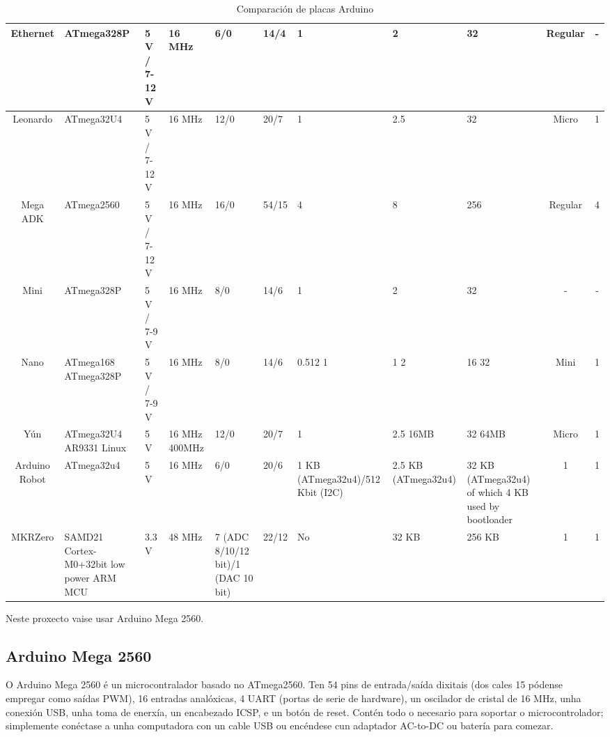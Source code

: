 \documentclass[11pt,twoside]{book}
\begin{document}
\begin{table}[htb]
\begin{center}
{\begin{tabular}{|c|m{3cm}|m{3.5cm}|m{2cm}|m{2cm}|m{2cm}|m{2cm}|m{2cm}|m{2cm}|c|c|}
\hline
Ethernet & ATmega328P & 5 V / 7-12 V & 16 MHz & 6/0 & 14/4 & 1 & 2 & 32 & Regular & - \\
\hline
Leonardo & ATmega32U4 & 5 V / 7-12 V & 16 MHz & 12/0 & 20/7 & 1 & 2.5 & 32 & Micro & 1 \\
\hline
Mega ADK & ATmega2560 & 5 V / 7-12 V & 16 MHz & 16/0 & 54/15 & 4 & 8 & 256 & Regular & 4 \\
\hline
Mini & ATmega328P & 5 V / 7-9 V & 16 MHz & 8/0 & 14/6 & 1 & 2 & 32 & - & - \\
\hline
Nano & ATmega168 \newline ATmega328P & 5 V / 7-9 V & 16 MHz & 8/0 & 14/6 & 0.512  1 & 1  2 & 16 32 & Mini & 1 \\
\hline
Yún & ATmega32U4 \newline AR9331 Linux & 5 V & 16 MHz \newline 400MHz & 12/0 & 20/7 & 1 & 2.5 \newline  16MB & 32 \newline   64MB & Micro & 1 \\
\hline
Arduino Robot & ATmega32u4 & 5 V & 16 MHz & 6/0 & 20/6 & 1 KB (ATmega32u4)/512 Kbit (I2C) & 2.5 KB (ATmega32u4) & 32 KB (ATmega32u4) of which 4 KB used by bootloader & 1 & 1 \\
\hline
MKRZero & SAMD21 \newline  Cortex-M0+32bit low power \newline ARM MCU & 3.3 V & 48 MHz & 7 (ADC 8/10/12 bit)/1 (DAC 10 bit) & 22/12 & No & 32 KB & 256 KB & 1 & 1 \\
\hline
\end{tabular}
}
\caption{Comparación de placas Arduino}
\label{taboa:comparacion}
\end{center}
\end{table}

Neste proxecto vaise usar Arduino Mega 2560.

\subsection{Arduino Mega 2560}

O Arduino Mega 2560 é un microcontralador basado no ATmega2560. Ten 54 pins de entrada/saída dixitais (dos cales 15 pódense empregar como saídas PWM), 16 entradas analóxicas, 4 UART (portas de serie de hardware), un oscilador de cristal de 16 MHz, unha conexión USB, unha toma de enerxía, un encabezado ICSP, e un botón de reset. Contén todo o necesario para soportar o microcontrolador; simplemente conéctase a unha computadora con un cable USB ou encéndese cun adaptador AC-to-DC ou batería para comezar. 
\end{document}
